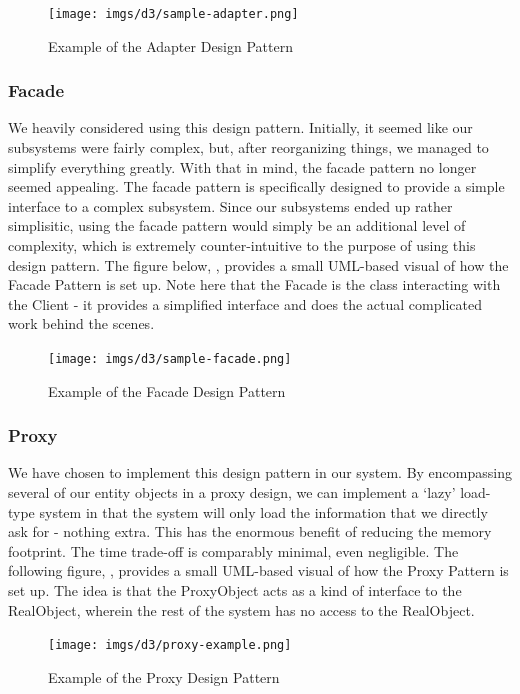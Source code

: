 \documentclass[12pt,letterpaper]{article}
\begin{document}
\begin{figure}[H]
	\centering{}
	\texttt{[image: imgs/d3/sample-adapter.png]}
	\caption{Example of the Adapter Design Pattern}
\end{figure}

\subsubsection*{Facade}
We heavily considered using this design pattern. Initially, it seemed like our subsystems were fairly complex, but, after reorganizing things, we managed to simplify everything greatly. With that in mind, the facade pattern no longer seemed appealing. The facade pattern is specifically designed to provide a simple interface to a complex subsystem. Since our subsystems ended up rather simplisitic, using the facade pattern would simply be an additional level of complexity, which is extremely counter-intuitive to the purpose of using this design pattern. The figure below, , provides a small UML-based visual of how the Facade Pattern is set up. Note here that the Facade is the class interacting with the Client - it provides a simplified interface and does the actual complicated work behind the scenes.

\begin{figure}[H]
	\centering{}
	\texttt{[image: imgs/d3/sample-facade.png]}
	\caption{Example of the Facade Design Pattern}
\end{figure}

\subsubsection*{Proxy}
We have chosen to implement this design pattern in our system. By encompassing several of our entity objects in a proxy design, we can implement a `lazy' load-type system in that the system will only load the information that we directly ask for - nothing extra. This has the enormous benefit of reducing the memory footprint. The time trade-off is comparably minimal, even negligible. The following figure, , provides a small UML-based visual of how the Proxy Pattern is set up. The idea is that the ProxyObject acts as a kind of interface to the RealObject, wherein the rest of the system has no access to the RealObject.

\begin{figure}[H]
	\centering{}
	\texttt{[image: imgs/d3/proxy-example.png]}
	\caption{Example of the Proxy Design Pattern}
\end{figure}
\end{document}
